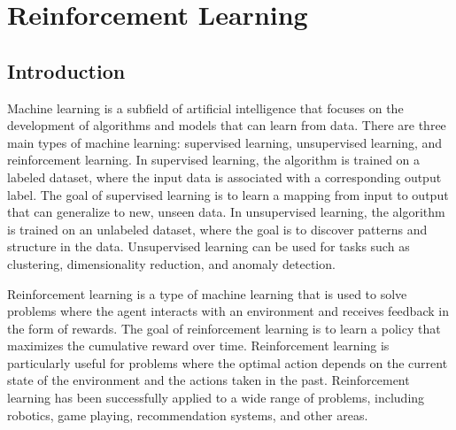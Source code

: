 \chapter{Reinforcement Learning}\label{chap:reinforcement}




\section{Introduction}\label{sec:rl-intro}
Machine learning is a subfield of artificial intelligence that focuses on the development of algorithms and models that can learn from data. There are three main types of machine learning: supervised learning, unsupervised learning, and reinforcement learning. In supervised learning, the algorithm is trained on a labeled dataset, where the input data is associated with a corresponding output label. The goal of supervised learning is to learn a mapping from input to output that can generalize to new, unseen data. In unsupervised learning, the algorithm is trained on an unlabeled dataset, where the goal is to discover patterns and structure in the data. Unsupervised learning can be used for tasks such as clustering\cite{}, dimensionality reduction\cite{}, and anomaly detection\cite{}.

Reinforcement learning is a type of machine learning that is used to solve problems where the agent interacts with an environment and receives feedback in the form of rewards. The goal of reinforcement learning is to learn a policy that maximizes the cumulative reward over time. Reinforcement learning is particularly useful for problems where the optimal action depends on the current state of the environment and the actions taken in the past. Reinforcement learning has been successfully applied to a wide range of problems, including robotics\cite{}, game playing\cite{}, recommendation systems\cite{}, and other areas.

